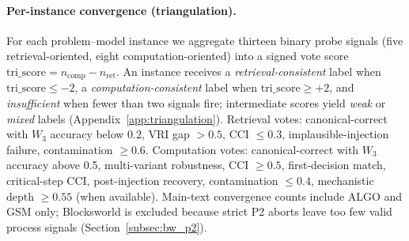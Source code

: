 
\paragraph{Per-instance convergence (triangulation).}
For each problem--model instance we aggregate thirteen binary probe signals
(five retrieval-oriented, eight computation-oriented) into a signed vote score
$\mathrm{tri\_score} = n_{\mathrm{comp}} - n_{\mathrm{ret}}$.
An instance receives a \emph{retrieval-consistent} label when
$\mathrm{tri\_score} \le -2$, a \emph{computation-consistent} label when
$\mathrm{tri\_score} \ge +2$, and \emph{insufficient} when fewer than two
signals fire; intermediate scores yield \emph{weak} or \emph{mixed} labels
(Appendix~\ref{app:triangulation}).
Retrieval votes: canonical-correct with $W_3$ accuracy below 0.2, VRI gap
${>}0.5$, CCI $\le 0.3$, implausible-injection failure, contamination
$\ge 0.6$.
Computation votes: canonical-correct with $W_3$ accuracy above 0.5, multi-variant
robustness, CCI $\ge 0.5$, first-decision match, critical-step CCI,
post-injection recovery, contamination $\le 0.4$, mechanistic depth
$\ge 0.55$ (when available).
Main-text convergence counts include ALGO and GSM only; Blocksworld is excluded
because strict P2 aborts leave too few valid process signals (Section~\ref{subsec:bw_p2}).
